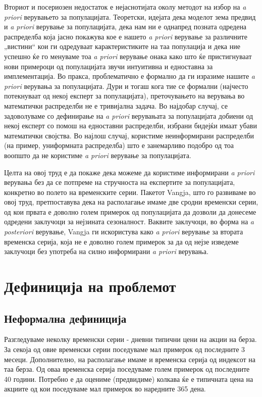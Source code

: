 \documentclass[12pt]{article}
\numberwithin{equation}{section}
\begin{document}
Вториот и посериозен недостаток е нејаснотијата околу методот на избор на \textit{a priori} верувањето за популацијата. Теоретски, идејата дека моделот зема предвид и \textit{a priori} верување за популацијата, дека нам ни е однапред позната одредена распределба која јасно покажува кое е нашето \textit{a priori} верување за различните „вистини“ кои ги одредуваат карактеристиките на таа популација и дека ние успешно ќе го менуваме тоа \textit{a priori} верување онака како што ќе пристигнуваат нови примероци од популацијата звучи интуитивна и едноставна за имплементација. Во пракса, проблематично е формално да ги изразиме нашите \textit{a priori} верувања за популацијата. Дури и тогаш кога тие се формални (најчесто потекнуваат од некој експерт за популацијата), преточувањето на верувања во математички распределби не е тривијална задача. Во најдобар случај, се задоволуваме со дефинирање на \textit{a priori} верувањата за популацијата добиени од некој експерт со помош на едноставни распределби, избрани бидејќи имаат убави математички својства. Во најлош случај, користиме неинформирани распределби (на пример, униформната распределба) што е занемарливо подобро од тоа воопшто да не користиме \textit{a priori} верување за популацијата.

Целта на овој труд е да покаже дека можеме да користиме информирани \textit{a priori} верувања без да се потпреме на стручноста на експертите за популацијата, конкретно во полето на временските серии. Пакетот Vangja, што го развиваме во овој труд, претпоставува дека на располагање имаме две сродни временски серии, од кои првата е доволно голем примерок од популацијата да дозволи да донесеме одредени заклучоци за нејзината сезоналност. Ваквите заклучоци, во форма на \textit{a posteriori} верување, Vangja ги искористува како \textit{a priori} верување за втората временска серија, која не е доволно голем примерок за да од нејзе изведеме заклучоци без употреба на силно информирани \textit{a priori} верувања.


\newpage

\section{Дефиниција на проблемот} \label{problem_definition}

\subsection{Неформална дефиниција}

Разгледуваме неколку временски серии - дневни типични цени на акции на берза. За секоја од овие временски серии поседуваме мал примерок од последните 3 месеци. Дополнително, на располагање имаме и временска серија од индексот на таа берза. Од оваа временска серија поседуваме голем примерок од последните 40 години. Потребно е да оцениме (предвидиме) колкава ќе е типичната цена на акциите од кои поседуваме мал примерок во наредните 365 дена.
\end{document}
